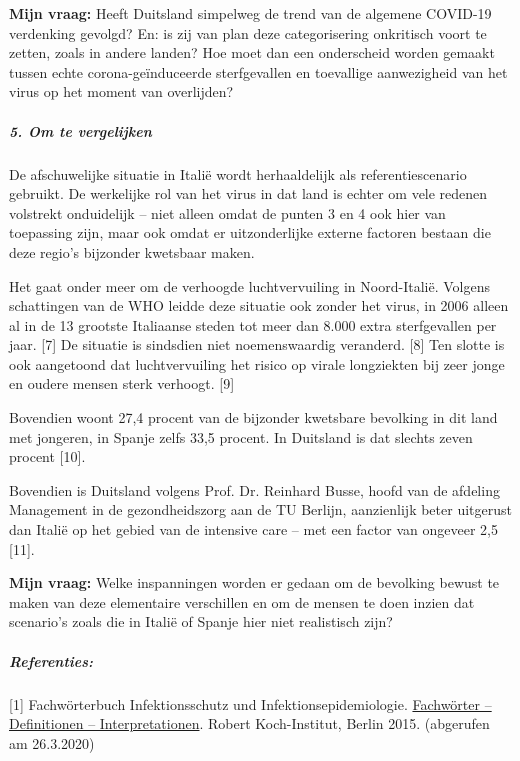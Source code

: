 \textbf{Mijn vraag:} Heeft Duitsland simpelweg de trend van de algemene
COVID-19 verdenking gevolgd? En: is zij van plan deze categorisering
onkritisch voort te zetten, zoals in andere landen? Hoe moet dan een
onderscheid worden gemaakt tussen echte corona-geïnduceerde
sterfgevallen en toevallige aanwezigheid van het virus op het moment van
overlijden?~

\hypertarget{5-om-te-vergelijken}{%
\subparagraph{\texorpdfstring{\textbf{5. Om te
vergelijken}}{5. Om te vergelijken}}\label{5-om-te-vergelijken}}

De afschuwelijke situatie in Italië wordt herhaaldelijk als
referentiescenario gebruikt. De werkelijke rol van het virus in dat land
is echter om vele redenen volstrekt onduidelijk -- niet alleen omdat de
punten 3 en 4 ook hier van toepassing zijn, maar ook omdat er
uitzonderlijke externe factoren bestaan die deze regio's bijzonder
kwetsbaar maken.

Het gaat onder meer om de verhoogde luchtvervuiling in Noord-Italië.
Volgens schattingen van de WHO leidde deze situatie ook zonder het
virus, in 2006 alleen al in de 13 grootste Italiaanse steden tot meer
dan 8.000 extra sterfgevallen per jaar. {[}7{]} De situatie is sindsdien
niet noemenswaardig veranderd. {[}8{]} Ten slotte is ook aangetoond dat
luchtvervuiling het risico op virale longziekten bij zeer jonge en
oudere mensen sterk verhoogt. {[}9{]}

Bovendien woont 27,4 procent van de bijzonder kwetsbare bevolking in dit
land met jongeren, in Spanje zelfs 33,5 procent. In Duitsland is dat
slechts zeven procent {[}10{]}.

Bovendien is Duitsland volgens Prof. Dr. Reinhard Busse, hoofd van de
afdeling Management in de gezondheidszorg aan de TU Berlijn, aanzienlijk
beter uitgerust dan Italië op het gebied van de intensive care -- met
een factor van ongeveer 2,5 {[}11{]}.

\textbf{Mijn vraag:} Welke inspanningen worden er gedaan om de bevolking
bewust te maken van deze elementaire verschillen en om de mensen te doen
inzien dat scenario's zoals die in Italië of Spanje hier niet
realistisch zijn?~

\hypertarget{referenties}{%
\subparagraph{\texorpdfstring{\textbf{Referenties:}}{Referenties:}}\label{referenties}}

{[}1{]} Fachwörterbuch Infektionsschutz und Infektionsepidemiologie.
\href{https://www.rki.de/DE/Content/Service/Publikationen/Fachwoerterbuch_Infektionsschutz.html}{Fachwörter
-- Definitionen -- Interpretationen}. Robert Koch-Institut, Berlin 2015.
(abgerufen am 26.3.2020)

